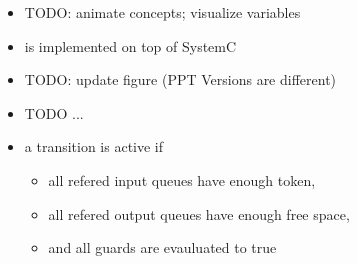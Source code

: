 \begin{frame}[t]
\begin{figure}
\centering
\resizebox{1\columnwidth}{!}{}
\end{figure}
\begin{itemize}
\item TODO: animate concepts; visualize variables
\end{itemize}
\end{frame}







\begin{frame}[t]
\begin{figure}
\centering
\resizebox{0.5\columnwidth}{!}{}
\end{figure}
\begin{itemize}
\item \SysteMoC{} is implemented on top of SystemC
\item TODO: update figure (PPT Versions are different)
\end{itemize}
\end{frame}






\begin{frame}[t]
\begin{itemize}
\item TODO ...
\item a transition is active if 
\begin{itemize}
\item all refered input queues have enough token,
\item all refered output queues have enough free space,
\item and all guards are evauluated to true
\end{itemize}
\end{itemize}
\end{frame}






